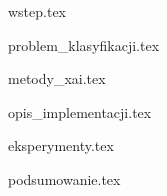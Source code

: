 \documentclass[12pt]{article}
\numberwithin{figure}{section}
\numberwithin{table}{section}
\begin{document}



\newpage
\tableofcontents
\thispagestyle{empty}

\newpage
\setcounter{page}{1}
{wstep.tex}

\newpage
{problem_klasyfikacji.tex}

\newpage
{metody_xai.tex}

\newpage
{opis_implementacji.tex}

\newpage
{eksperymenty.tex}

\newpage
{podsumowanie.tex}

\newpage
\pagestyle{empty}
\cleardoublepage
{}
\printbibliography[heading=bibintoc,title={Literatura}]
\end{document}
